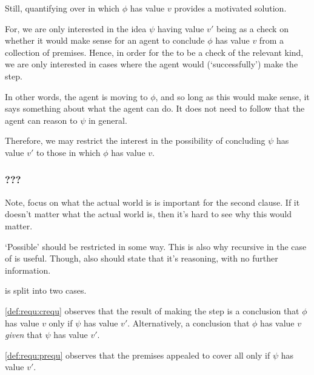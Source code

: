 \begin{note}[Solution]
  \color{red}
  Still, quantifying over  in which \(\phi\) has value \(v\) provides a motivated solution.

  For, we are only interested in the idea \(\psi\) having value \(v'\) being \crequ{} as a check on whether it would make sense for an agent to conclude \(\phi\) has value \(v\) from a collection of premises.
  Hence, in order for the \crequ{} to be a check of the relevant kind, we are only interested in cases where the agent would (`successfully') make the step.

  In other words, the agent is moving to \(\phi\), and so long as this would make sense, it says something about what the agent can do.
  It does not need to follow that the agent can reason to \(\psi\) in general.

  Therefore, we may restrict the interest in the possibility of concluding \(\psi\) has value \(v'\) to those  in which \(\phi\) has value \(v\).
\end{note}

\subsubsection{???}

\begin{note}
    \color{red}
    Note, focus on what the actual world is is important for the second clause.
    If it doesn't matter what the actual world is, then it's hard to see why this would matter.

    `Possible' should be restricted in some way.
    This is also why recursive in the case of \support{} is useful.
    Though, also should state that it's reasoning, with no further information.

    \requ{} is split into two cases.

    \ref{def:requ:crequ} observes that the result of making the step is a conclusion that \(\phi\) has value \(v\) only if \(\psi\) has value \(v'\).
    Alternatively, a conclusion that \(\phi\) has value \(v\) \emph{given} that \(\psi\) has value \(v'\).

    \ref{def:requ:prequ} observes that the premises appealed to cover all  only if \(\psi\) has value \(v'\).
\end{note}

